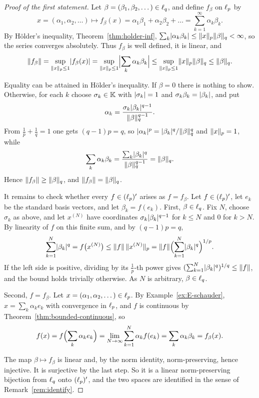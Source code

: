 \begin{proof}[Proof of the first statement]
Let $\beta = (\beta_1, \beta_2, \dots) \in \ell_{q}$, and define $f_\beta$ on
$\ell_{p}$ by
\[
  x = (\alpha_1, \alpha_2, \dots) \longmapsto
  f_\beta(x) = \alpha_1 \beta_1 + \alpha_2 \beta_2 + \dots
  = \sum_{k=1}^{\infty} \alpha_k \beta_k .
\]
By Hölder's inequality, Theorem~\ref{thm:holder-inf},
$\sum_k \lvert\alpha_k \beta_k\rvert \le \lVert x\rVert_p \lVert\beta\rVert_q < \infty$, so
the series converges absolutely. Thus $f_\beta$ is well defined, it is
linear, and
\[
  \lVert f_\beta\rVert = \sup_{\lVert x\rVert_p \le 1} \lvert f_\beta(x)\rvert
  = \sup_{\lVert x\rVert_p \le 1} \Bigl\lvert \sum_k \alpha_k \beta_k \Bigr\rvert
  \le \sup_{\lVert x\rVert_p \le 1} \lVert x\rVert_p \lVert\beta\rVert_q
  \le \lVert\beta\rVert_q .
\]

Equality can be attained in Hölder's inequality. If $\beta = 0$ there is
nothing to show. Otherwise, for each $k$ choose $\sigma_k \in \mathbb{K}$ with
$\lvert\sigma_k\rvert = 1$ and $\sigma_k \beta_k = \lvert\beta_k\rvert$, and put
\[
  \alpha_k = \frac{\sigma_k \lvert\beta_k\rvert^{q-1}}{\lVert\beta\rVert_q^{q-1}} .
\]
From $\frac{1}{p} + \frac{1}{q} = 1$ one gets $(q-1)p = q$, so
$\lvert\alpha_k\rvert^p = \lvert\beta_k\rvert^q / \lVert\beta\rVert_q^q$ and
$\lVert x\rVert_p = 1$, while
\[
  \sum_k \alpha_k \beta_k
  = \frac{\sum_k \lvert\beta_k\rvert^q}{\lVert\beta\rVert_q^{q-1}}
  = \lVert\beta\rVert_q .
\]
Hence $\lVert f_\beta\rVert \ge \lVert\beta\rVert_q$, and $\lVert f_\beta\rVert = \lVert\beta\rVert_q$.

It remains to check whether every $f \in (\ell_{p})'$ arises as $f = f_\beta$.
Let $f \in (\ell_{p})'$, let $e_k$ be the standard basis vectors, and let
$\beta_k = f(e_k)$. First, $\beta \in \ell_{q}$. Fix $N$, choose $\sigma_k$ as
above, and let $x^{(N)}$ have coordinates $\sigma_k \lvert\beta_k\rvert^{q-1}$ for
$k \le N$ and $0$ for $k > N$. By linearity of $f$ on this finite sum, and
by $(q-1)p = q$,
\[
  \sum_{k=1}^{N} \lvert\beta_k\rvert^q = f\bigl(x^{(N)}\bigr)
  \le \lVert f\rVert\,\lVert x^{(N)}\rVert_p
  = \lVert f\rVert \Bigl(\sum_{k=1}^{N} \lvert\beta_k\rvert^q\Bigr)^{1/p} .
\]
If the left side is positive, dividing by its $\frac{1}{p}$-th power gives
$(\sum_{k=1}^{N} \lvert\beta_k\rvert^q)^{1/q} \le \lVert f\rVert$, and the bound holds
trivially otherwise. As $N$ is arbitrary, $\beta \in \ell_{q}$.

Second, $f = f_\beta$. Let $x = (\alpha_1, \alpha_2, \dots) \in \ell_{p}$. By
Example~\ref{ex:E-schauder}, $x = \sum_k \alpha_k e_k$ with convergence in
$\ell_{p}$, and $f$ is continuous by Theorem~\ref{thm:bounded-continuous}, so
\[
  f(x) = f\Bigl(\sum_{k} \alpha_k e_k\Bigr)
  = \lim_{N \to \infty} \sum_{k=1}^{N} \alpha_k f(e_k)
  = \sum_{k} \alpha_k \beta_k = f_\beta(x) .
\]

The map $\beta \mapsto f_\beta$ is linear and, by the norm identity,
norm-preserving, hence injective. It is surjective by the last step. So it is
a linear norm-preserving bijection from $\ell_{q}$ onto $(\ell_{p})'$, and the
two spaces are identified in the sense of Remark~\ref{rem:identify}.
\end{proof}


